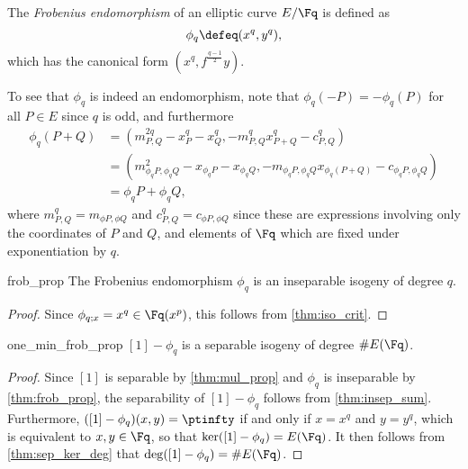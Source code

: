 \begin{dfn}{}{}
The \emph{Frobenius endomorphism} of an elliptic curve $E / \Fq$ is defined as
\[
\phi_q \defeq (x^q, y^q),
\]
which has the canonical form $(x^q, f^\frac{q-1}{2} y)$.
\end{dfn}

To see that $\phi_q$ is indeed an endomorphism, note that $\phi_q(-P) = -\phi_q(P)$ for all $P \in E$ since $q$ is odd, and furthermore
\begin{align*}
\phi_q(P + Q) &= (m_{P,Q}^{2q} - x_P^q - x_Q^q, -m_{P,Q}^q x_{P+Q}^q - c_{P,Q}^q) \\
&= (m_{\phi_q P,\phi_q Q}^2 - x_{\phi_q P} - x_{\phi_q Q}, -m_{\phi_q P,\phi_q Q} x_{\phi_q(P + Q)} - c_{\phi_q P,\phi_q Q}) \\
&= \phi_q P + \phi_q Q,
\end{align*}
where $m_{P, Q}^q = m_{\phi P, \phi Q}$ and $c_{P, Q}^q = c_{\phi P, \phi Q}$ since these are expressions involving only the coordinates of $P$ and $Q$, and elements of $\Fq$ which are fixed under exponentiation by $q$.

\begin{thm}{}{frob_prop}
The Frobenius endomorphism $\phi_q$ is an inseparable isogeny of degree $q$.
\end{thm}
\begin{proof}
Since $\phi_{q;x} = x^q \in \Fq(x^p)$, this follows from \cref{thm:iso_crit}.
\end{proof}

\begin{thm}{}{one_min_frob_prop}
$[1] - \phi_q$ is a separable isogeny of degree $\#E(\Fq)$.
\end{thm}
\begin{proof}
Since $[1]$ is separable by \cref{thm:mul_prop} and $\phi_q$ is inseparable by \cref{thm:frob_prop}, the separability of $[1] - \phi_q$ follows from \cref{thm:insep_sum}. Furthermore, $([1] - \phi_q)(x, y) = \ptinfty$ if and only if $x = x^q$ and $y = y^q$, which is equivalent to $x, y \in \Fq$, so that $\ker([1] - \phi_q) = E(\Fq)$. It then follows from \cref{thm:sep_ker_deg} that $\deg([1] - \phi_q) = \#E(\Fq)$.
\end{proof}
